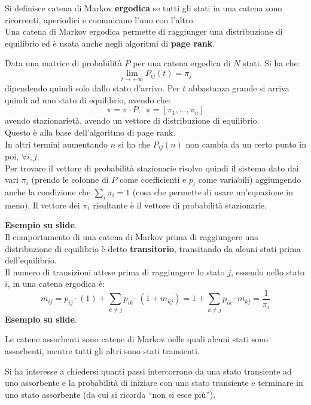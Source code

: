 \message{ !name(modprob.tex)}\documentclass[a4paper,12pt, oneside]{book}
\begin{document}
\begin{definizione}
  Si definisce catena di Markov \textbf{ergodica} se tutti gli stati in una
  catena sono ricorrenti, aperiodici e comunicano l’uno con l’altro.\\
  Una catena di Markov ergodica permette di raggiunger una distribuzione di
  equilibrio ed è usata anche negli algoritmi di \textbf{page rank}.
\end{definizione}
\begin{teorema}
  Data una matrice di probabilità $P$ per una catena ergodica di $N$ stati. Si
  ha che:
  \[\lim_{t\to+\infty} P_{ij}(t)=\pi_j\]
  dipendendo quindi solo dallo stato d'arrivo. Per $t$ abbastanza grande si
  arriva quindi ad uno stato di equilibrio, avendo che:
  \[\pi=\pi\cdot P,\,\,\,\pi=[\pi_1,\ldots,\pi_n]\]
  avendo stazionarietà, avendo un vettore di distribuzione di equilibrio.\\
  Questo è alla base dell'algoritmo di page rank.\\
  In altri termini aumentando $n$ si ha che $P_{ij}(n)$ non cambia da un certo
  punto in poi, $\forall i,j$.\\
  Per trovare il vettore di probabilità stazionarie risolvo quindi il sistema
  dato dai vari $\pi_i$ (prendo le colonne di $P$ come coefficienti e $p_i$ come
  variabili) aggiungendo anche la condizione che $\sum_i \pi_i=1$ (cosa che
  permette di usare un'equazione in meno). Il vettore dei $\pi_i$ risultante è
  il vettore di probabilità stazionarie.
\end{teorema}
\textbf{Esempio su slide}.\\
Il comportamento di una catena di Markov prima di raggiungere una distribuzione
di equilibrio è detto \textbf{transitorio}, transitando da alcuni stati prima
dell'equilibrio. \\
Il numero di transizioni attese prima di raggiungere lo stato $j$, essendo nello
stato $i$, in una catena ergodica è:
\[m_{ij}=p_{ij}\cdot(1)+\sum_{k\neq j}p_{ik}\cdot(1+m_{kj})=1+\sum_{k\neq
    j}p_{ik}\cdot m_{kj}=\frac{1}{\pi_i}\]
\textbf{Esempio su slide}.
\begin{definizione}
  Le catene assorbenti sono catene di Markov nelle quali alcuni stati sono
  assorbenti, mentre tutti gli altri sono stati transienti.
\end{definizione}
Si ha interesse a chiedersi quanti passi intercorrono da una stato transiente
ad uno assorbente e la probabilità di iniziare con uno stato transiente e
terminare in uno stato assorbente (da cui si ricorda ``non si esce più'').
\end{document}
